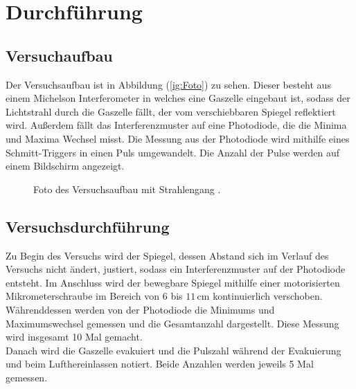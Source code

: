 \section{Durchführung}
\label{sec:Durchführung}
\subsection{Versuchaufbau}
Der Versuchsaufbau ist in Abbildung (\ref{ig:Foto}) zu sehen. Dieser besteht aus einem Michelson Interferometer in welches eine Gaszelle eingebaut ist, sodass 
der Lichtstrahl durch die Gaszelle fällt, der vom verschiebbaren Spiegel reflektiert wird. Außerdem fällt das Interferenzmuster auf eine Photodiode, die die 
Minima und Maxima Wechsel misst. Die Messung aus der Photodiode wird mithilfe eines Schmitt-Triggers in einen Puls umgewandelt. Die Anzahl der Pulse werden 
auf einem Bildschirm angezeigt. 
\begin{figure}[H]
    \centering
    \caption{Foto des Versuchsaufbau mit Strahlengang \cite{anleitungV401}.}
    \label{fig:Foto}
\end{figure}
\subsection{Versuchsdurchführung}
Zu Begin des Versuchs wird der Spiegel, dessen Abstand sich im Verlauf des Versuchs nicht ändert, justiert, sodass ein Interferenzmuster auf der 
Photodiode entsteht. Im Anschluss wird der bewegbare Spiegel mithilfe einer motorisierten Mikrometerschraube im Bereich von $6$ bis $11 \, \unit{\centi\meter}$ 
kontinuierlich verschoben. Währenddessen werden von der Photodiode die Minimums und Maximumswechsel gemessen und die Gesamtanzahl dargestellt. Diese Messung 
wird insgesamt 10 Mal gemacht. \\
Danach wird die Gaszelle evakuiert und die Pulszahl während der Evakuierung und beim Lufthereinlassen notiert. Beide Anzahlen werden jeweils 5 Mal gemessen. 
